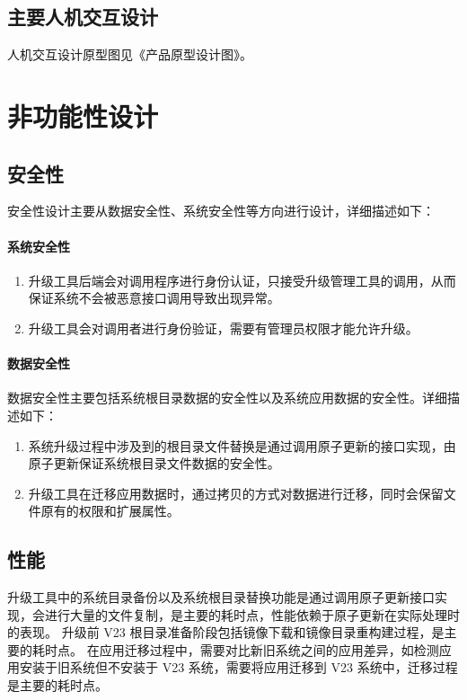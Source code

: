 \documentclass{utart}
\begin{document}
\subsection{主要人机交互设计}
人机交互设计原型图见《产品原型设计图》。

\section{非功能性设计}
\subsection{安全性}
安全性设计主要从数据安全性、系统安全性等方向进行设计，详细描述如下：

\paragraph{系统安全性}
\begin{enumerate}
    \item 升级工具后端会对调用程序进行身份认证，只接受升级管理工具的调用，从而保证系统不会被恶意接口调用导致出现异常。
    \item 升级工具会对调用者进行身份验证，需要有管理员权限才能允许升级。
\end{enumerate}

\paragraph{数据安全性}
数据安全性主要包括系统根目录数据的安全性以及系统应用数据的安全性。详细描述如下：
\begin{enumerate}
    \item 系统升级过程中涉及到的根目录文件替换是通过调用原子更新的接口实现，由原子更新保证系统根目录文件数据的安全性。
    \item 升级工具在迁移应用数据时，通过拷贝的方式对数据进行迁移，同时会保留文件原有的权限和扩展属性。
\end{enumerate}

\subsection{性能}
升级工具中的系统目录备份以及系统根目录替换功能是通过调用原子更新接口实现，会进行大量的文件复制，是主要的耗时点，性能依赖于原子更新在实际处理时的表现。
升级前 V23 根目录准备阶段包括镜像下载和镜像目录重构建过程，是主要的耗时点。
在应用迁移过程中，需要对比新旧系统之间的应用差异，如检测应用安装于旧系统但不安装于 V23 系统，需要将应用迁移到 V23 系统中，迁移过程是主要的耗时点。
\end{document}
